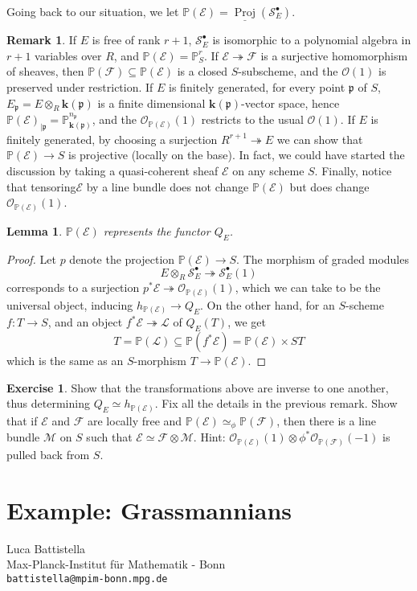 \documentclass[11pt,twoside]{report}
\newcommand{\PP}{\mathbb P}
\newcommand{\kk}{\mathbf k}
\newcommand{\OO}{\mathcal O}
\renewcommand{\to}{\rightarrow}
\newcommand{\Proj}{\operatorname{Proj}}
\theoremstyle{plain}
\newtheorem{lem}[thm]{Lemma}
\theoremstyle{definition}
\newtheorem{exe}[thm]{Exercise}
\newtheorem{rem}[thm]{Remark}
\begin{document}
Going back to our situation, we let $\PP(\mathcal E)=\underline{\Proj}(\mathcal S^\bullet_E)$.
\begin{rem}
 If $E$ is free of rank $r+1$, $\mathcal S^\bullet_E$ is isomorphic to a polynomial algebra in $r+1$ variables over $R$, and $\PP(\mathcal E)=\PP^r_S$. If $\mathcal E \twoheadrightarrow\mathcal F$ is a surjective homomorphism of sheaves, then $\PP(\mathcal F)\subseteq\PP(\mathcal E)$ is a closed $S$-subscheme, and the $\OO(1)$ is preserved under restriction. If $E$ is finitely generated, for every point $\mathfrak p$ of $S$, $E_{\mathfrak p}=E\otimes_R \kk(\mathfrak p)$ is a finite dimensional $\kk(\mathfrak p)$-vector space, hence $\PP(\mathcal E)_{|\mathfrak p}=\PP^{n_{\mathfrak p}}_{\kk(\mathfrak p)}$, and the $\OO_{\PP(\mathcal E)}(1)$ restricts to the usual $\OO(1)$. If $E$ is finitely generated, by choosing a surjection $R^{r+1}\twoheadrightarrow E$ we can show that $\PP(\mathcal E)\to S$ is projective (locally on the base). In fact, we could have started the discussion by taking a quasi-coherent sheaf $\mathcal E$ on any scheme $S$. Finally, notice that tensoring$\mathcal E$ by a line bundle does not change $\PP(\mathcal E)$ but does change $\OO_{\PP(\mathcal E)}(1)$.
\end{rem}
\begin{lem}
 $\PP(\mathcal E)$ represents the functor $Q_E$.
\end{lem}
\begin{proof}
 Let $p$ denote the projection $\PP(\mathcal E)\to S$. The morphism of graded modules
 \[E\otimes_R\mathcal S^\bullet_E\twoheadrightarrow \mathcal S^\bullet_E(1)\]
 corresponds to a surjection $p^*\mathcal E\twoheadrightarrow\OO_{\PP(\mathcal E)}(1)$, which we can take to be the universal object, inducing $h_{\PP(\mathcal E)}\to Q_E$. On the other hand, for an $S$-scheme $f\colon T\to S$, and an object $f^*\mathcal E\twoheadrightarrow\mathcal L$ of $Q_E(T)$, we get
 \[T=\PP(\mathcal L)\subseteq \PP(f^*\mathcal E)=\PP(\mathcal E)\times S T\]
 which is the same as an $S$-morphism $T\to\PP(\mathcal E)$.
\end{proof}
\begin{exe}
 Show that the transformations above are inverse to one another, thus determining $Q_E\simeq h_{\PP(\mathcal E)}$. Fix all the details in the previous remark. Show that if $\mathcal E$ and $\mathcal F$ are locally free and $\PP(\mathcal E)\simeq_\phi\PP(\mathcal F)$, then there is a line bundle $\mathcal M$ on $S$ such that $\mathcal E\simeq\mathcal F\otimes\mathcal M$. Hint: $\OO_{\PP(\mathcal E)}(1)\otimes\phi^*\OO_{\PP(\mathcal F)}(-1)$ is pulled back from $S$.
\end{exe}


\section{Example: Grassmannians}

\newpage

\noindent Luca Battistella\\
Max-Planck-Institut f\"ur Mathematik - Bonn \\
\texttt{battistella@mpim-bonn.mpg.de}\\
\end{document}
